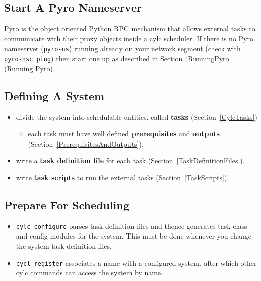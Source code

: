 \documentclass[11pt,a4paper]{article}
\begin{document}
\subsection{Start A Pyro Nameserver}
\label{QuickStartAPyroNameserver}

Pyro is the object oriented Python RPC mechanism that allows external
tasks to communicate with their proxy objects inside a cylc scheduler.
If there is no Pyro nameserver (\lstinline=pyro-ns=) running already on
your network segment (check with \lstinline=pyro-nsc ping=) then start
one up as described in Section~\ref{RunningPyro} (Running Pyro).

\subsection{Defining A System} 
\label{QuickDefineASystem}

\begin{itemize}
    \item divide the system into schedulable entities, called {\bf tasks}
        (Section~\ref{CylcTasks})
        
    \begin{itemize}
        \item each task must have well defined {\bf prerequisites} and {\bf
            outputs} (Section~\ref{PrerequisitesAndOutputs}).
    \end{itemize}

    \item write a {\bf task definition file} for each task
        (Section~\ref{TaskDefinitionFiles}).

    \item write {\bf task scripts} to run the external tasks
        (Section~\ref{TaskScripts}).
\end{itemize}

\subsection{Prepare For Scheduling}
\label{QuickPrepareForScheduling}

\begin{itemize}
    \item \lstinline=cylc configure= parses
        task definition files and thence generates task class and config
        modules for the system. This must be done whenever you change
        the system task definition files. 

    \item \lstinline=cycl register=
        associates a name with a configured system, after which other
        cylc commands can access the system by name. 
\end{itemize}
\end{document}
